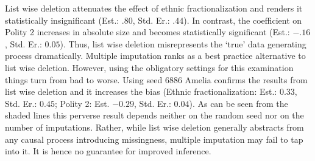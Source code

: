 \documentclass{scrartcl}\usepackage[]{graphicx}\usepackage[]{color}
\begin{document}
List wise deletion attenuates the effect of ethnic
fractionalization and renders it statistically insignificant
(Est.: $.80$, Std. Er.: $.44$). In contrast, the
coefficient on Polity 2 increases in absolute size and
becomes statistically significant (Est.: $-.16$, Std. Er.:
$0.05$). Thus, list wise deletion misrepresents the `true'
data generating process dramatically. Multiple imputation
ranks as a best practice alternative to list wise deletion.
However, using the obligatory settings for this examination
things turn from bad to worse. Using seed $6886$ Amelia 
confirms the results from list wise deletion and it 
increases the bias (Ethnic fractionalization: Est.: $0.33$, 
Std. Er.: $0.45$; Polity 2: Est. $-0.29$, Std. Er.: $0.04$).
As can be seen from the shaded lines this perverse result 
depends neither on the random seed nor on the number of 
imputations. Rather, while list wise deletion generally 
abstracts from any causal process introducing missingness, 
multiple imputation may fail to tap into it. It is hence no
guarantee for improved inference.
\end{document}
